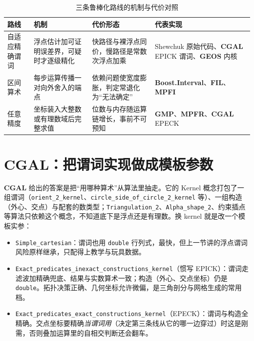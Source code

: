 \documentclass[12pt,a4paper,fontset=fandol]{ctexbook}
\newcommand{\Tp}[1]{\texttt{#1}}
\newcommand{\Lib}[1]{\textbf{#1}}
\begin{document}
\begin{table}[H]
\centering
\caption{三条鲁棒化路线的机制与代价对照}
\label{tab:ch08-routes}
\small
\begin{tabular}{@{}>{\raggedright\arraybackslash}p{}
  >{\raggedright\arraybackslash}p{}
  >{\raggedright\arraybackslash}p{}
  >{\raggedright\arraybackslash}p{}@{}}
\toprule
路线 & 机制 & 代价形态 & 代表实现 \\
\midrule
自适应精确谓词 & 浮点估计加可证明误差界，可疑时才逐级精化 &
  快路径与裸浮点同价，慢路径是常数次浮点加乘 &
  Shewchuk 原始代码、\Lib{CGAL} EPICK 谓词、\Lib{GEOS} 内核 \\
区间算术 & 每步运算传播一对向外舍入的端点 &
  依赖问题使宽度膨胀，判定常退化为``无法确定'' &
  \Lib{Boost.Interval}、\Lib{FIL}、\Lib{MPFI} \\
任意精度 & 坐标装入大整数或有理数域后完整求值 &
  位数与内存随运算链增长，事前不可预知 &
  \Lib{GMP}、\Lib{MPFR}、\Lib{CGAL} EPECK \\
\bottomrule
\end{tabular}
\end{table}

\section{\Lib{CGAL}：把谓词实现做成模板参数}

\Lib{CGAL} 给出的答案是把``用哪种算术''从算法里抽走。它的 Kernel 概念打包了一组谓词（\Tp{orient\_2\_kernel}、\Tp{circle\allowbreak\_side\allowbreak\_of\allowbreak\_circle\allowbreak\_2\allowbreak\_kernel} 等）、一组构造（外心、交点）与配套的数类型；\Tp{Triangulation\_2}、\Tp{Alpha\allowbreak\_shape\_2}、约束插点等算法只依赖这个概念，不知道底下是浮点还是有理数。换 kernel 就是改一个模板实参：

\begin{itemize}
\item \Tp{Simple\_cartesian}：谓词也用 \Tp{double} 行列式，最快，但上一节讲的浮点谓词风险原样继承，只配得上教学与玩具数据。
\item \Tp{Exact\_predicates\allowbreak\_inexact\allowbreak\_constructions\allowbreak\_kernel}（惯写 EPICK）：谓词走滤波加精确兜底、结果与实数算术一致；构造（外心、交点坐标）仍是 \Tp{double}。拓扑决策正确、几何坐标允许微偏，是三角剖分与网格生成的常用档。
\item \Tp{Exact\_predicates\allowbreak\_exact\allowbreak\_constructions\allowbreak\_kernel}（EPECK）：谓词与构造全精确。交点坐标要精确\emph{当谓词用}（决定第三条线从它的哪一边穿过）时这是刚需，否则叠加运算里的自相交判断还会翻车。
\end{itemize}
\end{document}
